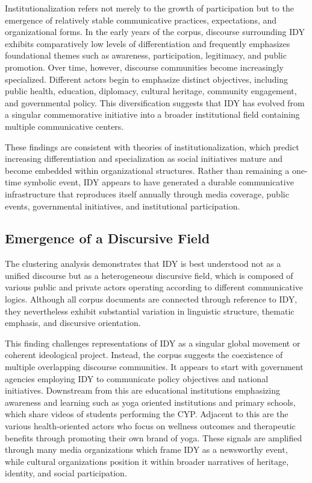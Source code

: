 \documentclass[11pt]{article}
\begin{document}
{Institutionalization refers not merely to the growth of participation but to the emergence of relatively stable communicative practices, expectations, and organizational forms. In the early years of the corpus, discourse surrounding IDY exhibits comparatively low levels of differentiation and frequently emphasizes foundational themes such as awareness, participation, legitimacy, and public promotion. Over time, however, discourse communities become increasingly specialized. Different actors begin to emphasize distinct objectives, including public health, education, diplomacy, cultural heritage, community engagement, and governmental policy. This diversification suggests that IDY has evolved from a singular commemorative initiative into a broader institutional field containing multiple communicative centers.

These findings are consistent with theories of institutionalization, which predict increasing differentiation and specialization as social initiatives mature and become embedded within organizational structures. Rather than remaining a one-time symbolic event, IDY appears to have generated a durable communicative infrastructure that reproduces itself annually through media coverage, public events, governmental initiatives, and institutional participation.


\subsection{Emergence of a Discursive Field}

The clustering analysis demonstrates that IDY is best understood not as a unified discourse but as a heterogeneous discursive field, which is composed of various public and private actors operating according to different communicative logics. Although all corpus documents are connected through reference to IDY, they nevertheless exhibit substantial variation in linguistic structure, thematic emphasis, and discursive orientation.

This finding challenges representations of IDY as a singular global movement or coherent ideological project. Instead, the corpus suggests the coexistence of multiple overlapping discourse communities. It appears to start with government agencies employing IDY to communicate policy objectives and national initiatives. Downstream from this are educational institutions emphasizing awareness and learning such as yoga oriented institutions and primary schools, which share videos of students performing the CYP. Adjacent to this are the various health-oriented actors who focus on wellness outcomes and therapeutic benefits through promoting their own brand of yoga. These signals are amplified through many media organizations which frame IDY as a newsworthy event, while cultural organizations position it within broader narratives of heritage, identity, and social participation.

}
\end{document}
